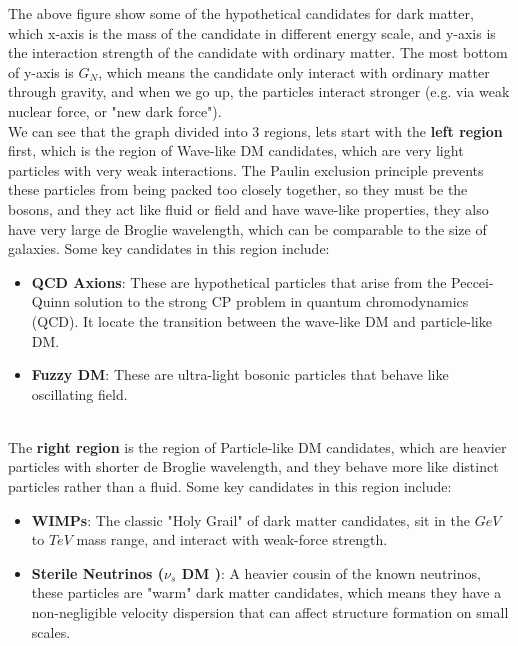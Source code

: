 \begin{extra}
    The above figure show some of the hypothetical candidates for dark matter, which x-axis is the mass of the candidate in different energy scale, and y-axis is the interaction strength of the candidate with ordinary matter. The most bottom of y-axis is $G_N$, which means the candidate only interact with ordinary matter through gravity, and when we go up, the particles interact stronger (e.g. via weak nuclear force, or "new dark force"). \\

    We can see that the graph divided into 3 regions, lets start with the \textbf{left region} first, which is the region of Wave-like DM candidates, which are very light particles with very weak interactions. The Paulin exclusion principle prevents these particles from being packed too closely together, so they must be the bosons, and they act like fluid or field and have wave-like properties, they also have very large de Broglie wavelength, which can be comparable to the size of galaxies. Some key candidates in this region include:
    \begin{itemize}
        \item \textbf{QCD Axions}: These are hypothetical particles that arise from the Peccei-Quinn solution to the strong CP problem in quantum chromodynamics (QCD). It locate the transition between the wave-like DM and particle-like DM.
        \item \textbf{Fuzzy DM}: These are ultra-light bosonic particles that behave like oscillating field.
    \end{itemize}
    \\

    The \textbf{right region} is the region of Particle-like DM candidates, which are heavier particles with shorter de Broglie wavelength, and they behave more like distinct particles rather than a fluid. Some key candidates in this region include:
    \begin{itemize}
        \item \textbf{WIMPs}: The classic "Holy Grail" of dark matter candidates, sit in the $GeV$ to $TeV$ mass range, and interact with weak-force strength.
        \item \textbf{Sterile Neutrinos ($\nu_s$ DM )}: A heavier cousin of the known neutrinos, these particles are "warm" dark matter candidates, which means they have a non-negligible velocity dispersion that can affect structure formation on small scales.
    \end{itemize}


\end{extra}

